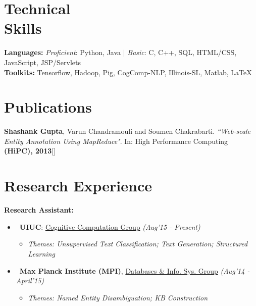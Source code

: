 \documentclass[margin,line]{templates/resume}
\newcommand{\myhref}[3][blue]{\href{#2}{\color{#1}{#3}}}
\newcommand{\compresslist}{%
\setlength{\itemsep}{3pt}%
\setlength{\parskip}{0pt}%
\setlength{\parsep}{0pt}%
}
\begin{document}
\begin{resume}
\vspace{-0.1cm}    
\section{\mysidestyle Technical\\ Skills}
\textbf{Languages:} \textit{Proficient}: Python, Java $|$ \textit{Basic}: C, C++, SQL, HTML/CSS, JavaScript, JSP/Servlets \\
\textbf{Toolkits:} Tensorflow, Hadoop, Pig, CogComp-NLP, Illinois-SL, Matlab, LaTeX

\vspace{-0.1cm}
\section{\mysidestyle Publications}
\vspace{0mm}
\textbf{Shashank Gupta}, Varun Chandramouli and Soumen Chakrabarti. \textit{``Web-scale Entity Annotation Using MapReduce"}. In: High Performance Computing \textbf{(HiPC), 2013}\hfill{[\myhref[darkblue]{https://github.com/shatu/shatu.github.io/blob/master/papers/Web-scale_Entity_Annotation_Using_MapReduce.pdf}{PDF}]}

\vspace{-0.1cm}
\section{\mysidestyle Research Experience} 
\textsf{\textbf{Research Assistant:}}
\begin{itemize}[leftmargin = 0.7cm]\compresslist
\item~\textbf{UIUC}: \href{http://cogcomp.org/}{Cognitive Computation Group} \hfill{\small\textit{(Aug'15 - Present)}} \vspace{-1mm}
\begin{itemize}[leftmargin=*]\compresslist
        \item[]\small\textit{Themes: Unsupervised Text Classification; Text Generation; Structured Learning}
    \end{itemize}
  
\item~\textbf{Max Planck Institute (MPI)}, \href{https://www.mpi-inf.mpg.de/departments/databases-and-information-systems/}{Databases \& Info. Sys. Group}  \hfill{\small\textit{(Aug'14 - April'15)}}
\vspace{-1mm}
\begin{itemize}[leftmargin=*]\compresslist
        \item[]\small\textit{Themes: Named Entity Disambiguation; KB Construction}
    \end{itemize}


\end{itemize}
\end{resume}
\end{document}
